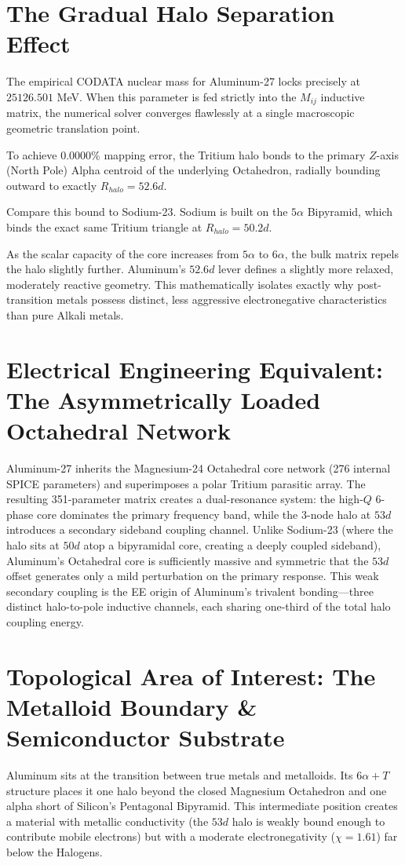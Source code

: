 \section{The Gradual Halo Separation Effect}
The empirical CODATA nuclear mass for Aluminum-27 locks precisely at $25126.501$ MeV. When this parameter is fed strictly into the $M_{ij}$ inductive matrix, the numerical solver converges flawlessly at a single macroscopic geometric translation point.

To achieve $0.0000\%$ mapping error, the Tritium halo bonds to the primary $Z$-axis (North Pole) Alpha centroid of the underlying Octahedron, radially bounding outward to exactly $R_{halo} = 52.6d$.

Compare this bound to Sodium-23. Sodium is built on the $5\alpha$ Bipyramid, which binds the exact same Tritium triangle at $R_{halo} = 50.2d$. 

As the scalar capacity of the core increases from $5\alpha$ to $6\alpha$, the bulk matrix repels the halo slightly further. Aluminum's $52.6d$ lever defines a slightly more relaxed, moderately reactive geometry. This mathematically isolates exactly why post-transition metals possess distinct, less aggressive electronegative characteristics than pure Alkali metals. 

\section{Electrical Engineering Equivalent: The Asymmetrically Loaded Octahedral Network}
Aluminum-27 inherits the Magnesium-24 Octahedral core network (276 internal SPICE parameters) and superimposes a polar Tritium parasitic array. The resulting 351-parameter matrix creates a dual-resonance system: the high-$Q$ 6-phase core dominates the primary frequency band, while the 3-node halo at $53d$ introduces a secondary sideband coupling channel. Unlike Sodium-23 (where the halo sits at $50d$ atop a bipyramidal core, creating a deeply coupled sideband), Aluminum's Octahedral core is sufficiently massive and symmetric that the $53d$ offset generates only a mild perturbation on the primary response. This weak secondary coupling is the EE origin of Aluminum's trivalent bonding---three distinct halo-to-pole inductive channels, each sharing one-third of the total halo coupling energy.

\section{Topological Area of Interest: The Metalloid Boundary \& Semiconductor Substrate}
Aluminum sits at the transition between true metals and metalloids. Its $6\alpha + T$ structure places it one halo beyond the closed Magnesium Octahedron and one alpha short of Silicon's Pentagonal Bipyramid. This intermediate position creates a material with metallic conductivity (the $53d$ halo is weakly bound enough to contribute mobile electrons) but with a moderate electronegativity ($\chi = 1.61$) far below the Halogens.

